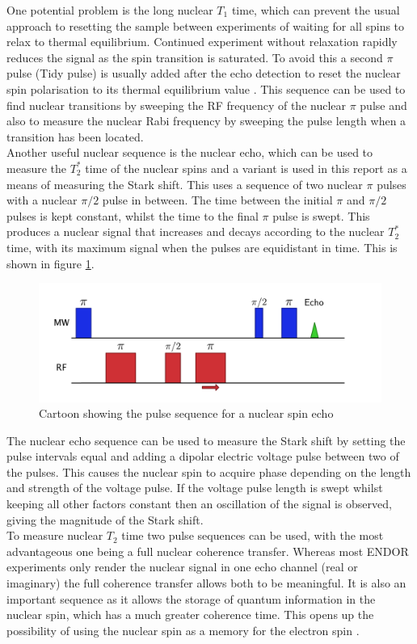 One potential problem is the long nuclear $T_1$ time, which can prevent the usual approach to resetting the sample between experiments of waiting for all spins to relax to thermal equilibrium.
Continued experiment without relaxation rapidly reduces the signal as the spin transition is saturated.
To avoid this a second $\pi$ pulse (Tidy pulse) is usually added after the echo detection to reset the nuclear spin polarisation to its thermal equilibrium value \cite{Morton2008a}.
This sequence can be used to find nuclear transitions by sweeping the RF frequency of the nuclear $\pi$ pulse and also to measure the nuclear Rabi frequency by sweeping the pulse length when a transition has been located.
\\
Another useful nuclear sequence is the nuclear echo, which can be used to measure the $T_2^*$ time of the nuclear spins and a variant is used in this report as a means of measuring the Stark shift.
This uses a sequence of two nuclear $\pi$ pulses with a nuclear $\pi/2$ pulse in between.
The time between the initial $\pi$ and $\pi/2$ pulses is kept constant, whilst the time to the final $\pi$ pulse is swept.
This produces a nuclear signal that increases and decays according to the nuclear $T_2^*$ time, with its maximum signal when the pulses are equidistant in time.
This is shown in figure \ref{fig:nuclearecho}.

\begin{figure}
\centering
\includegraphics[width=\columnwidth]{Figures/NucEchoSequence2.pdf}
\caption[Nuclear echo pulse sequence]{Cartoon showing the pulse sequence for a nuclear spin echo}
\label{fig:nuclearecho}
\end{figure}

The nuclear echo sequence can be used to measure the Stark shift by setting the pulse intervals equal and adding a dipolar electric voltage pulse between two of the pulses.
This causes the nuclear spin to acquire phase depending on the length and strength of the voltage pulse.
If the voltage pulse length is swept whilst keeping all other factors constant then an oscillation of the signal is observed, giving the magnitude of the Stark shift.
\\
To measure nuclear $T_2$ time two pulse sequences can be used, with the most advantageous one being a full nuclear coherence transfer.
Whereas most ENDOR experiments only render the nuclear signal in one echo channel (real or imaginary) the full coherence transfer allows both to be meaningful.
It is also an important sequence as it allows the storage of quantum information in the nuclear spin, which has a much greater coherence time.
This opens up the possibility of using the nuclear spin as a memory for the electron spin \cite{Morton2008b}.

